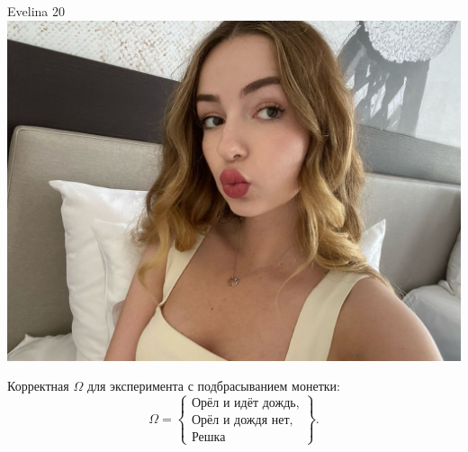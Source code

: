 \documentclass[12pt]{article}
\begin{document}
\begin{minipage}{0.45\textwidth}
\begin{tinderf}{Evelina 20}
\includegraphics[width=\textwidth]{tinder-photo/tinder-evelina.jpg}

  

\begin{mybox}
Корректная $\Omega$  для эксперимента с подбрасыванием монетки:
\[
\Omega = \left\{\begin{array}{l}
\text{Орёл и идёт дождь},\\
\text{Орёл и дождя нет},\\
\text{Решка}
\end{array}\right\}.
\]
\end{mybox}
\end{tinderf}
\end{minipage}
\end{document}
